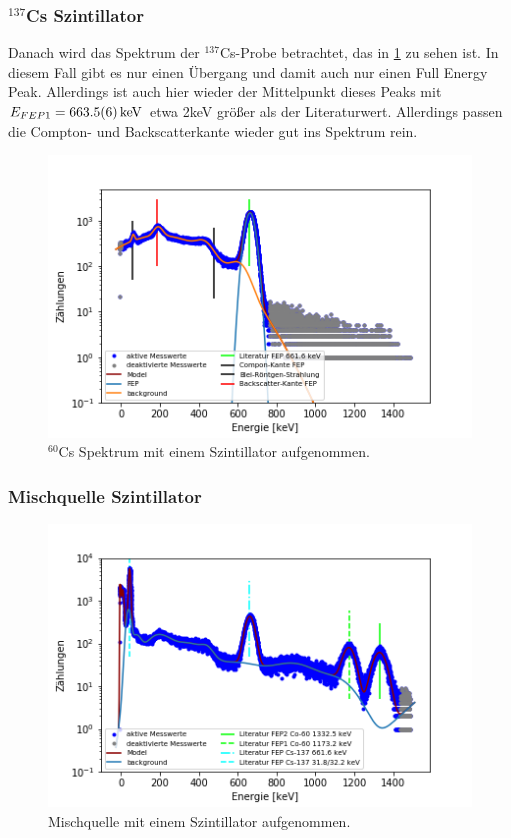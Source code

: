 \subsubsection{$^{137}$Cs Szintillator}
Danach wird das Spektrum der $^{137}$Cs-Probe betrachtet, das in \cref{cs_sz} zu sehen ist. In diesem Fall gibt es nur einen Übergang und damit auch nur einen Full Energy Peak. Allerdings ist auch hier wieder der Mittelpunkt dieses Peaks mit $E_{FEP1} = \SI{663,5 \pm 0,6}{keV}$ etwa 2keV größer als der Literaturwert. Allerdings passen die Compton- und Backscatterkante wieder gut ins Spektrum rein.



\begin{figure}[ht]
	\centering
	\includegraphics[scale=0.8]{cs_sz_.png}
	\caption{$^{60}$Cs Spektrum mit einem Szintillator aufgenommen.}
	\label{cs_sz}
\end{figure}



\subsubsection{Mischquelle Szintillator}

\begin{figure}[ht]
	\centering
	\includegraphics[scale=0.8]{Mischquelle_sz_.png}
	\caption{Mischquelle mit einem Szintillator aufgenommen.}
	\label{Mischquelle_sz}
\end{figure}


